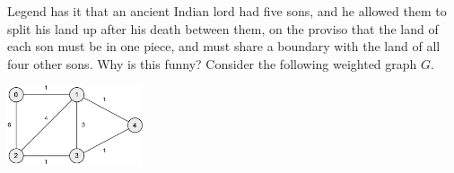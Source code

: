 \begin{questions}
  \question Legend has it that an ancient Indian lord had five sons, and he allowed them to split his land up after his death between
            them, on the proviso that the land of each son must be in one piece, and must share a boundary with the land of all four
            other sons. Why is this funny?
  \clearpage
  \question Consider the following weighted graph $ G $.
            \begin{center}
              \includegraphics[width=0.3\textwidth]{graph4}
            \end{center}
\end{questions}
